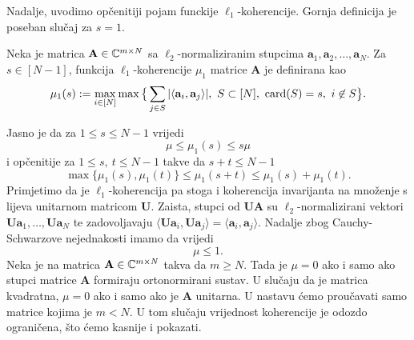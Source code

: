 \documentclass[a4paper,twoside,12pt]{memoir} %
\newcommand{\vect}[1]{\mathbf{#1}}
\renewcommand{\vec}{\vect}
\newcommand{\card}{\text{\normalfont{card}}}
\begin{document}
Nadalje, uvodimo op\v{c}enitiji pojam funckije $\ell_1$-koherencije. Gornja definicija je poseban slu\v{c}aj za $s = 1$.
\begin{defn}
    Neka je matrica $\vec A \in \C^{m \times N}$ sa $\ell_2$-normaliziranim stupcima  $\vec a_1, \vec a_2, \dots, \vec a_N$. Za $s \in [N-1]$, funkcija $\ell_1$-koherencije $\mu_1$ matrice $\vec A$ je definirana kao
    \begin{equation*}
        \mu_1(s) := \max_{i \in [N]} \max \big\{ \sum_{j \in S} |\langle \vec a_i, \vec a_j \rangle|,\ S \subset [N],\ \card(S) = s,\ i \not \in S   \big\} .
    \end{equation*}
\end{defn}
Jasno je da za $1 \leq s \leq N-1$ vrijedi
\begin{equation}\label{5:2}
    \mu \leq \mu_1(s) \leq s \mu
\end{equation}
i op\v{c}enitije za $1 \leq s,\ t \leq N-1$ takve da $s+t \leq N-1$
\begin{equation}\label{5:3}
    \max \{\mu_1(s), \mu_1(t)\}  \leq \mu_1(s+t) \leq \mu_1(s) + \mu_1(t).
\end{equation}
Primjetimo da je $\ell_1$-koherencija pa stoga i koherencija invarijanta na mno\v{z}enje s lijeva unitarnom matricom $\vec U$. Zaista, stupci od $\vec{UA}$ su $\ell_2$-normalizirani vektori $\vec{Ua}_1, \dots, \vec{Ua}_N$ te zadovoljavaju $\langle \vec{Ua}_i, \vec{Ua}_j \rangle = \langle \vec a_i , \vec a_j \rangle$. Nadalje zbog Cauchy-Schwarzove nejednakosti imamo da vrijedi
\begin{equation*}
   \mu \leq 1. 
\end{equation*}
Neka je na matrica $\vec A \in \C^{m \times N}$ takva da $m \geq N$. Tada je $\mu = 0$ ako i samo ako stupci matrice $\vec A$ formiraju ortonormirani sustav. U slu\v{c}aju da je matrica kvadratna, $\mu = 0$ ako i samo ako je $\vec A$ unitarna. U nastavu \'cemo prou\v{c}avati samo matrice kojima je $m < N$. U tom slu\v{c}aju vrijednost koherencije je odozdo ograni\v{c}ena, \v{s}to \'cemo kasnije i pokazati. 
\end{document}
